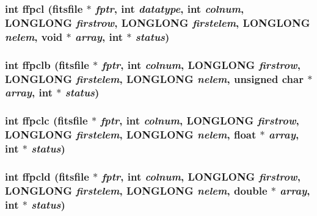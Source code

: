 \subsubsection{\setlength{\rightskip}{0pt plus 5cm}int ffpcl (\bf{fitsfile} $\ast$ {\em fptr}, int {\em datatype}, int {\em colnum}, \bf{LONGLONG} {\em firstrow}, \bf{LONGLONG} {\em firstelem}, \bf{LONGLONG} {\em nelem}, void $\ast$ {\em array}, int $\ast$ {\em status})}\label{test_2roimasker_2fitsio_8h_28b5f096ba5dc640cd642afdf31c7e01}


\subsubsection{\setlength{\rightskip}{0pt plus 5cm}int ffpclb (\bf{fitsfile} $\ast$ {\em fptr}, int {\em colnum}, \bf{LONGLONG} {\em firstrow}, \bf{LONGLONG} {\em firstelem}, \bf{LONGLONG} {\em nelem}, unsigned char $\ast$ {\em array}, int $\ast$ {\em status})}\label{test_2roimasker_2fitsio_8h_292509f5a619292d087aaa3b8b40a621}


\subsubsection{\setlength{\rightskip}{0pt plus 5cm}int ffpclc (\bf{fitsfile} $\ast$ {\em fptr}, int {\em colnum}, \bf{LONGLONG} {\em firstrow}, \bf{LONGLONG} {\em firstelem}, \bf{LONGLONG} {\em nelem}, float $\ast$ {\em array}, int $\ast$ {\em status})}\label{test_2roimasker_2fitsio_8h_f28b5d35cf1bfba0826c8bac66ecf702}


\subsubsection{\setlength{\rightskip}{0pt plus 5cm}int ffpcld (\bf{fitsfile} $\ast$ {\em fptr}, int {\em colnum}, \bf{LONGLONG} {\em firstrow}, \bf{LONGLONG} {\em firstelem}, \bf{LONGLONG} {\em nelem}, double $\ast$ {\em array}, int $\ast$ {\em status})}\label{test_2roimasker_2fitsio_8h_19edb8890772979f20c6f6e5957b2ad1}



